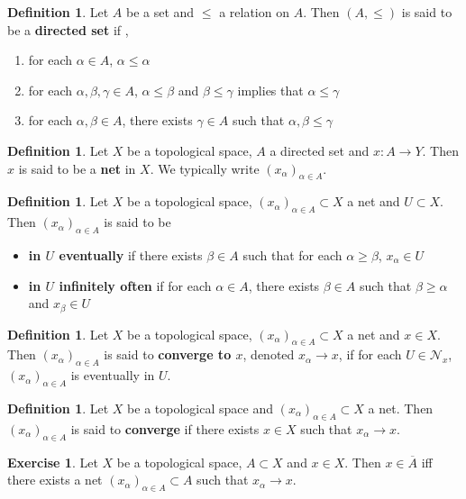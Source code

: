 \documentclass[12pt]{amsart}
\theoremstyle{definition}
\newtheorem{defn}[definition]{Definition}
\newtheorem{ex}[definition]{Exercise}
\newcommand{\al}{\alpha}
\newcommand{\gam}{\gamma}
\newcommand{\be}{\beta}
\newcommand{\MN}{\mathcal{N}}
\newcommand{\lex}[1]{\label{ex:#1}}
\newcommand{\ld}[1]{\label{defn:#1}}
\begin{document}
	\begin{defn} \ld{}
	Let $A$ be a set and $\leq$ a relation on $A$. Then $(A, \leq)$ is said to be a \textbf{directed set} if , 
	\begin{enumerate}
	\item for each $\al \in A$, $\al \leq \al$
	\item for each $\al, \be, \gam \in A$, $\al \leq \be$ and $\be \leq \gam$ implies that $\al \leq \gam$
	\item for each $\al, \be \in A$, there exists $\gam \in A$ such that $\al, \be \leq \gam$
	\end{enumerate}
	\end{defn}
	
	\begin{defn} \ld{}
	Let $X$ be a topological space, $A$ a directed set and $x:A \rightarrow Y$. Then $x$ is said to be a \textbf{net} in $X$. We typically write $(x_{\al})_{\al \in A}$. 
	\end{defn}
	
	\begin{defn} \ld{}
	Let $X$ be a topological space, $(x_{\al})_{\al \in A} \subset X$ a net and $U \subset X$.
	Then $(x_{\al})_{\al \in A}$ is said to be 
	\begin{itemize}
	\item \textbf{in $U$ eventually} if there exists $\be \in A$ such that for each $\al \geq \be$, $x_{\al} \in U$
	\item \textbf{in $U$ infinitely often}  if for each $\al \in A$, there exists $\be \in A$ such that $\be \geq \al $ and $x_{\be} \in U$
	\end{itemize}
	\end{defn}
	
	\begin{defn} \ld{}
	Let $X$ be a topological space, $(x_{\al})_{\al \in A} \subset X$ a net and $x \in X$. Then $(x_{\al})_{\al \in A}$ is said to \textbf{converge to $x$}, denoted $x_{\al} \rightarrow x$, if for each $U \in \MN_x$, $(x_{\al})_{\al \in A}$ is eventually in $U$. 
	\end{defn}	
	
	\begin{defn} \ld{}
	Let $X$ be a topological space and $(x_{\al})_{\al \in A} \subset X$ a net. Then $(x_{\al})_{\al \in A}$ is said to \textbf{converge} if there exists $x \in X$ such that $x_{\al} \rightarrow x$. 
	\end{defn}	
	
	\begin{ex} \lex{}
	Let $X$ be a topological space, $A \subset X$ and $x \in X$. Then $x \in \overline{A}$ iff there exists a net $(x_{\al})_{\al \in A} \subset A$ such that $x_{\al} \rightarrow x$. 
	\end{ex}
\end{document}
